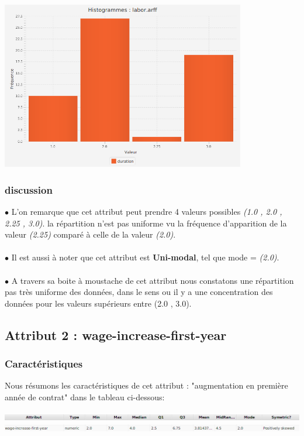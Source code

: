 \documentclass[12pt,a4paper,oneside]{book}
\begin{document}
	\begin{center}
		\includegraphics[width=0.8\textwidth]{screens/barchart/duration-barchart.png}%
		\label{labelname}%
	\end{center}
	
	\subsubsection{discussion}
	$\bullet $ L'on remarque que cet attribut peut prendre 4 valeurs possibles \textit{(1.0 , 2.0 , 2.25 , 3.0)}. la répartition n'est pas uniforme vu la fréquence d'apparition de la valeur \textit{(2.25)} comparé à celle de la valeur \textit{(2.0)}.\\
	\textbf{ }\\
	$\bullet $ Il est aussi à noter que cet attribut est \textbf{Uni-modal}, tel que mode = \textit{(2.0)}.\\
	\textbf{ }\\
	$\bullet $ A travers sa boite à moustache de cet attribut nous constatons une répartition pas très uniforme des données, dans le sens ou il y a une concentration des données pour les valeurs supérieurs entre (2.0 , 3.0).
	
	
	\newpage
	
	
	\subsection{Attribut 2 : wage-increase-first-year }
	\subsubsection{Caractéristiques}
	Nous résumons les caractéristiques de cet attribut : "augmentation en première année de contrat" dans le tableau ci-dessous:
	\begin{center}
		\includegraphics[width=1\textwidth]{screens/att.png}\\
		\includegraphics[width=1\textwidth]{screens/att-2.png}%
		\label{labelname}%
	\end{center}
	
\end{document}
